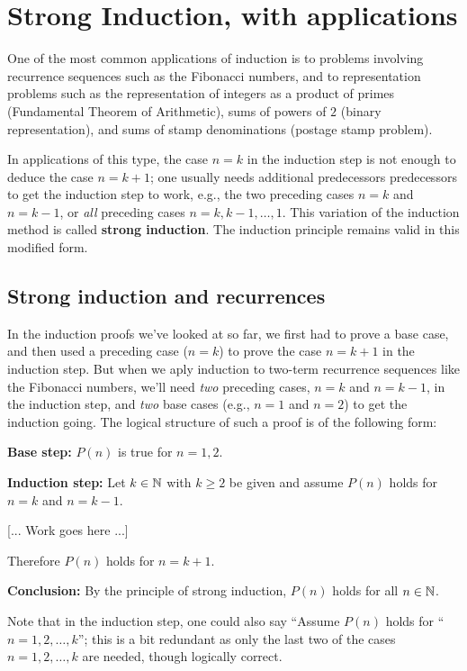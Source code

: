 \section{Strong Induction, with applications}\label{strong_induction}


One of the most common applications of induction is to problems involving
recurrence sequences such as the Fibonacci numbers, and to representation
problems such as the representation of integers as a product of primes
(Fundamental Theorem of Arithmetic), sums of powers of $2$ (binary
representation), and sums of stamp denominations (postage stamp problem).

In applications of this type, the case $n=k$ in the induction step is
not enough to deduce the case $n=k+1$; one usually needs additional
predecessors predecessors to get the induction step to work, e.g., 
the two preceding cases $n=k$ and $n=k-1$, or 
\emph{all} preceding cases
$n=k,k-1,\dots,1$.  This variation of the induction
method is called \textbf{strong induction}.  The induction principle
remains valid in this modified form. 


\subsection*{Strong induction and recurrences}
In the induction proofs we've looked at so far, we first had to prove a base case, and then used a preceding case ($n=k$) to prove the case $n=k+1$ in the induction step. But when we aply  induction to two-term recurrence sequences like the Fibonacci
numbers, we'll need \emph{two} preceding cases, $n=k$ and $n=k-1$, in
the induction step, and \emph{two} base cases (e.g., $n=1$ and $n=2$) to get
the induction going.  The logical structure of such a proof is of the
following form:

\noindent
\textbf{Base step:}  $P(n)$ is true for $n=1,2$.
\smallskip

\noindent
\textbf{Induction step:} Let $k\in\mathbb{N}$ with $k\ge 2$ be given
and assume $P(n)$ holds for $n=k$ and $n=k-1$.
\medskip

[... Work goes here ...] 
\medskip

\noindent
Therefore $P(n)$ holds for $n=k+1$.
\smallskip

\noindent
\textbf{Conclusion:} By the principle of strong induction, 
$P(n)$ holds for all $n\in\mathbb{N}$.
\smallskip

\noindent
Note that in the induction step, one could also say ``Assume
$P(n)$ holds for `` $n=1,2,\dots, k$''; this is a bit redundant as only
the last two of the cases $n=1,2,\dots,k$ are needed, though logically
correct. 

